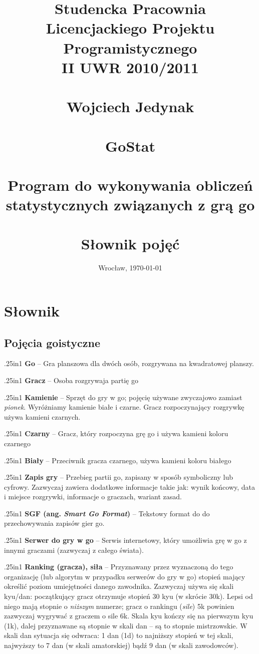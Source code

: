 \documentclass[12pt,leqno]{article}
\title{\normalsize \textbf{Studencka Pracownia Licencjackiego Projektu Programistycznego} \\
       \textbf{II UWR 2010/2011} \\ 
       \ \\
       \vspace{12em}
       \Large Wojciech Jedynak \\
       \normalsize \ \\
       \Huge GoStat \\
       \tiny \ \\
       \LARGE \textbf{Program do wykonywania obliczeń} \\
              \textbf{statystycznych związanych z grą go} \\ 
       \ \\
       \Large Słownik pojęć \\
       \vspace{12em}
       }
\date{Wrocław, \today}
\newcommand{\entry}[2]{
 \begin{hangparas}{.25in}{1}
  \noindent \textbf{#1} -- #2 \\
 \end{hangparas}
}
\begin{document}
\maketitle 
\thispagestyle{empty}

\newpage

\section{Słownik}

\subsection{Pojęcia goistyczne}

\entry{Go}{Gra planszowa dla dwóch osób, rozgrywana na kwadratowej planszy.}

\entry{Gracz}{Osoba rozgrywaja partię go}

\entry{Kamienie}{Sprzęt do gry w go; pojęcię używane zwyczajowo zamiast \emph{pionek}. Wyróżniamy kamienie
 białe i czarne. Gracz rozpoczynający rozgrywkę używa kamieni czarnych.}

\entry{Czarny}{Gracz, który rozpoczyna grę go i używa kamieni koloru czarnego}

\entry{Biały}{Przeciwnik gracza czarnego, używa kamieni koloru białego}

\entry{Zapis gry}{Przebieg partii go, zapisany w sposób symboliczny lub cyfrowy. Zazwyczaj zawiera
  dodatkowe informacje takie jak: wynik końcowy, data i miejsce rozgrywki, informacje o graczach, wariant zasad.}

\entry{SGF (ang. \emph{Smart Go Format})}{Tekstowy format do do przechowywania zapisów gier go.}

\entry{Serwer do gry w go}{Serwis internetowy, który umożliwia grę w go z innymi graczami (zazwyczaj z całego świata).}

\entry{Ranking (gracza), siła}{Przyznawany przez wyznaczoną do tego organizację (lub algorytm w przypadku serwerów do gry w go)
  stopień mający określić poziom umiejętności danego zawodnika. Zazwyczaj używa się skali kyu/dan: początkujący gracz
  otrzymuje stopień 30 kyu (w skrócie 30k). Lepsi od niego mają stopnie o \emph{niższym} numerze; gracz o rankingu (\emph{sile})
  5k powinien zazwyczaj wygrywać z graczem o sile 6k. Skala kyu kończy się na pierwszym kyu (1k), dalej przyznawane są stopnie
  w skali dan -- są to stopnie mistrzowskie. W skali dan sytuacja się odwraca: 1 dan (1d) to najniższy stopień w tej skali,
  najwyższy to 7 dan (w skali amatorskiej) bądź 9 dan (w skali zawodowców).}
\end{document}
